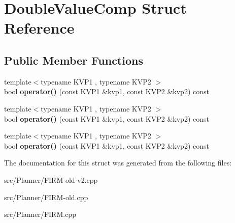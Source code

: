 \hypertarget{struct_double_value_comp}{\section{\-Double\-Value\-Comp \-Struct \-Reference}
\label{struct_double_value_comp}
}
\subsection*{\-Public \-Member \-Functions}
\begin{DoxyCompactItemize}
\item 
\hypertarget{struct_double_value_comp_ac6d9c50d9d2897ff6c452c71114d585e}{{\footnotesize template$<$typename K\-V\-P1 , typename K\-V\-P2 $>$ }\\bool {\bfseries operator()} (const \-K\-V\-P1 \&kvp1, const \-K\-V\-P2 \&kvp2) const }\label{struct_double_value_comp_ac6d9c50d9d2897ff6c452c71114d585e}

\item 
\hypertarget{struct_double_value_comp_ac6d9c50d9d2897ff6c452c71114d585e}{{\footnotesize template$<$typename K\-V\-P1 , typename K\-V\-P2 $>$ }\\bool {\bfseries operator()} (const \-K\-V\-P1 \&kvp1, const \-K\-V\-P2 \&kvp2) const }\label{struct_double_value_comp_ac6d9c50d9d2897ff6c452c71114d585e}

\item 
\hypertarget{struct_double_value_comp_ac6d9c50d9d2897ff6c452c71114d585e}{{\footnotesize template$<$typename K\-V\-P1 , typename K\-V\-P2 $>$ }\\bool {\bfseries operator()} (const \-K\-V\-P1 \&kvp1, const \-K\-V\-P2 \&kvp2) const }\label{struct_double_value_comp_ac6d9c50d9d2897ff6c452c71114d585e}

\end{DoxyCompactItemize}


\-The documentation for this struct was generated from the following files\-:\begin{DoxyCompactItemize}
\item 
src/\-Planner/\-F\-I\-R\-M-\/old-\/v2.\-cpp\item 
src/\-Planner/\-F\-I\-R\-M-\/old.\-cpp\item 
src/\-Planner/\-F\-I\-R\-M.\-cpp\end{DoxyCompactItemize}
